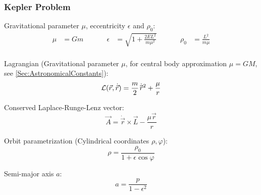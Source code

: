 		\subsubsection{Kepler Problem}
			\noindent
			Gravitational parameter  $\mu$, eccentricity $\epsilon$ and $\rho_0$:
			\begin{equation}
				\begin{aligned}
					\mu &= G m &\hspace{30pt}
					\epsilon &= \sqrt{1+\frac{2 E L^2}{m \mu^2}} &\hspace{30pt}
					\rho_0 &= \frac{L^2}{m\mu} \\
				\end{aligned}
			\end{equation}

			\noindent
			Lagrangian (Gravitational parameter $\mu$, for central body approximation $\mu=GM$, see \ref{Sec:AstronomicalConstants}):
			\begin{equation}
				\mathcal{L}(\vec{r},\dot{\vec{r}}) = \frac{m}{2} \dot{\pvec{r}}^2 + \frac{\mu}{r}
			\end{equation}

			\noindent
			Conserved Laplace-Runge-Lenz vector:%
			\begin{equation}
				\vec{A} = \dot{\vec{r}}\times\vec{L} - \frac{\mu \vec{r}}{r}
			\end{equation}

			\noindent
			Orbit parametrization (Cylindrical coordinates $\rho, \varphi$):
			\begin{equation}
				\rho = \frac{\rho_0}{1+\epsilon \cos\varphi}
			\end{equation}

			\noindent
			Semi-major axis $a$:
			\begin{equation}
				a = \frac{p}{1-\epsilon^2}
			\end{equation}
